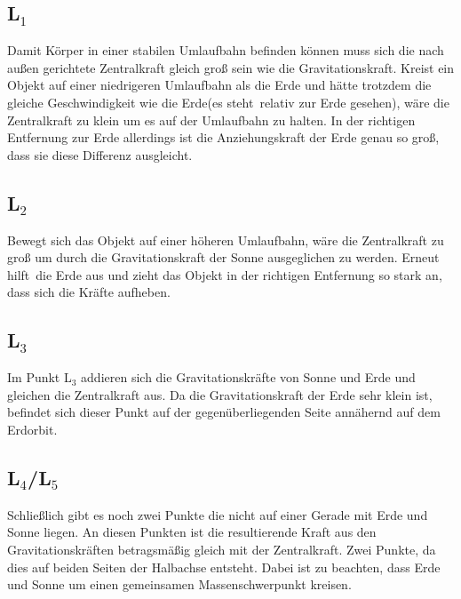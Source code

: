 \documentclass[12pt,a4paper]{article}
\begin{document}
\subsection{L$_1$}
Damit Körper in einer stabilen Umlaufbahn befinden können muss sich die nach außen  gerichtete Zentralkraft gleich groß sein wie die Gravitationskraft. Kreist ein Objekt auf einer niedrigeren Umlaufbahn als die Erde und hätte trotzdem die gleiche Geschwindigkeit wie die Erde(es \glqq steht\grqq ~relativ zur Erde gesehen), wäre die Zentralkraft zu klein um es auf der Umlaufbahn zu halten. In der richtigen Entfernung zur Erde allerdings ist die Anziehungskraft der Erde genau so groß, dass sie diese Differenz ausgleicht.
\subsection{L$_2$}
Bewegt sich das Objekt auf einer höheren Umlaufbahn, wäre die Zentralkraft zu groß um durch die Gravitationskraft der Sonne ausgeglichen zu werden. Erneut \glqq hilft\grqq ~die Erde aus und zieht das Objekt in der richtigen Entfernung so stark an, dass sich die Kräfte aufheben.
\subsection{L$_3$}
Im Punkt L$_3$ addieren sich die Gravitationskräfte von Sonne und Erde und gleichen die Zentralkraft aus. Da die Gravitationskraft der Erde sehr klein ist, befindet sich dieser Punkt auf der gegenüberliegenden Seite annähernd auf dem Erdorbit.
\subsection{L$_4$/L$_5$}
Schließlich gibt es noch zwei Punkte die nicht auf einer Gerade mit Erde und Sonne liegen. An diesen Punkten ist die resultierende Kraft aus den Gravitationskräften betragsmäßig gleich mit der Zentralkraft. Zwei Punkte, da dies auf beiden Seiten der Halbachse entsteht. Dabei ist zu beachten, dass Erde und Sonne um einen gemeinsamen Massenschwerpunkt kreisen. 

\newpage
\end{document}
